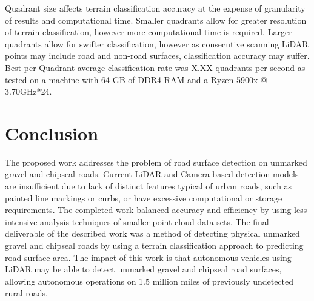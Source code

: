 \documentclass[journal,onecolumn]{IEEEtran}
\begin{document}
	
	
	
	{Quadrant size affects terrain classification accuracy at the expense of granularity of results and computational time. Smaller quadrants allow for greater resolution of terrain classification, however more computational time is required. Larger quadrants allow for swifter classification, however as consecutive scanning LiDAR points may include road and non-road surfaces, classification accuracy may suffer. Best per-Quadrant average classification rate was X.XX quadrants per second as tested on a machine with 64 GB of DDR4 RAM and a Ryzen 5900x @ 3.70GHz*24.}


\section{Conclusion}
	
	{The proposed work addresses the problem of road surface detection on unmarked gravel and chipseal roads. Current LiDAR and Camera based detection models are insufficient due to lack of distinct features typical of urban roads, such as painted line markings or curbs, or have excessive computational or storage requirements. The completed work balanced accuracy and efficiency by using less intensive analysis techniques of smaller point cloud data sets. The final deliverable of the described work was a method of detecting physical unmarked gravel and chipseal roads by using a terrain classification approach to predicting road surface area. The impact of this work is that autonomous vehicles using LiDAR may be able to detect unmarked gravel and chipseal road surfaces, allowing autonomous operations on 1.5 million miles of previously undetected rural roads.}


%
\IEEEpeerreviewmaketitle




\end{document}
